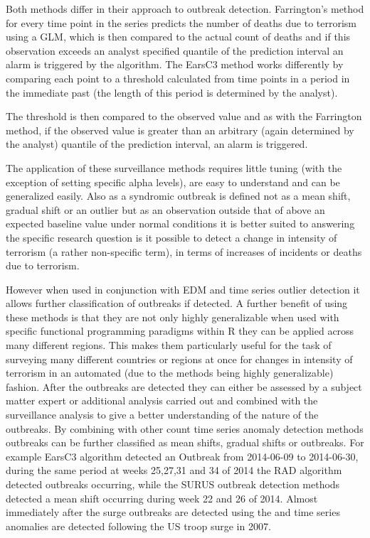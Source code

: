 Both methods differ in their approach to outbreak detection. Farrington’s method for every time point in the series predicts the number of deaths due to terrorism using a GLM, which is then compared to the actual count of deaths and if this observation exceeds an analyst specified quantile of the prediction interval an alarm is triggered by the algorithm. The EarsC3 method works differently by comparing each point to a threshold calculated from time points in a period in the immediate past (the length of this period is determined by the analyst). 

The threshold is then compared to the observed value and as with the Farrington method, if the observed value is greater than an arbitrary (again determined by the analyst) quantile of the prediction interval, an alarm is triggered.  

The application of these surveillance methods requires little tuning (with the exception of setting specific alpha levels), are easy to understand and can be generalized easily. Also as a syndromic outbreak is defined not as a mean shift, gradual shift or an outlier but as an observation outside that of above an expected baseline value under normal conditions it is better suited to answering the specific research question is it possible to detect a change in intensity of terrorism (a rather non-specific term), in terms of increases of incidents or deaths due to terrorism. 

However when used in conjunction with EDM and time series outlier detection it allows further classification of outbreaks if detected. A further benefit of using these methods is that they are not only highly generalizable when used with specific functional programming paradigms within R they can be applied across many different regions. This makes them particularly useful for the task of surveying many different countries or regions at once for changes in intensity of terrorism in an automated (due to the methods being highly generalizable) fashion.  After the outbreaks are detected they can either be assessed by a subject matter expert or additional analysis carried out and combined with the surveillance analysis to give a better understanding of the nature of the outbreaks. By combining with other count time series anomaly detection methods outbreaks can be further classified as mean shifts, gradual shifts or outbreaks. For example EarsC3 algorithm detected an Outbreak from 2014-06-09 to 2014-06-30, during the same period at weeks 25,27,31 and 34 of 2014 the RAD algorithm detected outbreaks occurring, while the SURUS \citep{kelly2015propagating} outbreak detection methods detected a mean shift occurring during week 22 and 26 of 2014. Almost immediately after the surge outbreaks are detected using the and time series anomalies are detected following the US troop surge in 2007.

